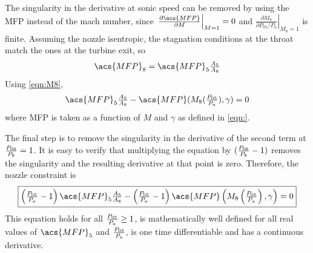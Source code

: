 \documentclass[tcc]{subfiles}
\begin{document}
The singularity in the derivative at sonic speed can be removed by using the \ac{MFP} instead of the mach number, since 
$\left.\frac{\partial\acs{MFP}}{\partial M} \right|_{M=1} = 0$ 
and 
$\left.\frac{\partial M_8}{\partial P_{05}/P_a}\right|_{M_8=1}$ is finite.
 Assuming the nozzle isentropic, the stagnation conditions at the throat match the ones at the turbine exit, so
\begin{equation}
    \acs{MFP}_8 = \acs{MFP}_5 \tfrac{A_5}{A_8}
\end{equation}
Using \cref{eqn:M8},
\begin{equation}
    \textstyle
    \acs{MFP}_5 \tfrac{A_5}{A_8} - \acs{MFP}(M_8(\pr{05}{a}), \gamma) = 0
\end{equation}
where \acs{MFP} is taken as a function of $M$ and $\gamma$ as defined in \cref{eqn:}.

The final step is to remove the singularity in the derivative of the second term at $\frac{P_{08}}{P_{8}} = 1$. 
It is easy to verify that multiplying the equation by $(\frac{P_{08}}{P_{8}}-1)$ removes the singularity and the resulting derivative at that point is zero. 
Therefore, the nozzle constraint is
\begin{equation}
    \boxed{
    \textstyle
        \left(\pr{05}{a}-1\right)\acs{MFP}_5\frac{A_5}{A_8} - \left(\pr{05}{a}-1\right)\acs{MFP}\left(M_8\left(\pr{05}{a}\right), \gamma\right) = 0
    }
\end{equation}
This equation holds for all $\frac{P_{05}}{P_{a}} \geq 1$, is mathematically well defined for all real values of $\acs{MFP}_5$ and $\frac{P_{05}}{P_{a}}$, is one time differentiable and has a continuous derivative.
\end{document}
